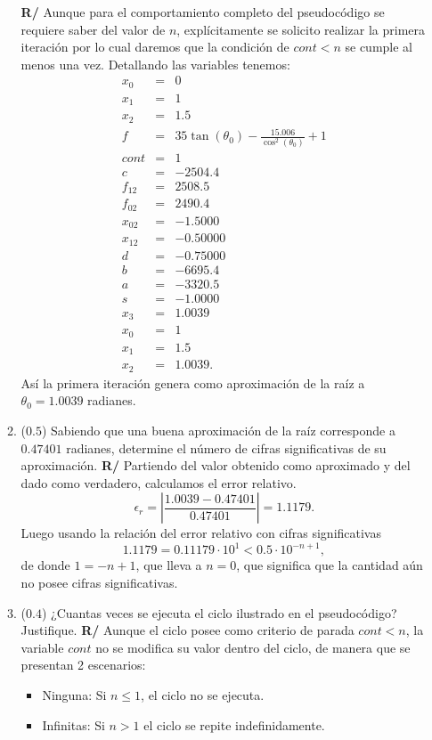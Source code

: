\documentclass[12pt]{article}
\begin{document}
\begin{enumerate}[leftmargin=*,widest=9]
\begin{enumerate}[label=\alph*]
\textbf{R/} Aunque para el comportamiento completo del pseudocódigo se requiere saber del valor de \(n\), explícitamente se solicito realizar la primera iteración por lo cual daremos que la condición de \(cont<n\) se cumple al menos una vez. Detallando las variables tenemos:
\begin{eqnarray*}
x_0 &=& 0\\
x_1 &=& 1\\
x_2 &=& 1.5\\
f &=& 35\tan(\theta_{0}) - \frac{15.006}{\cos^{2}(\theta_{0})} + 1\\
cont &=& 1\\
c &=& -2504.4\\
f_{12} &=& 2508.5\\
f_{02} &=& 2490.4\\
x_{02} &=& -1.5000\\
x_{12} &=& -0.50000\\
d &=& -0.75000\\
b &=& -6695.4\\
a &=& -3320.5\\
s &=& -1.0000\\
x_3 &=& 1.0039\\
x_0 &=& 1\\
x_1 &=& 1.5\\
x_2 &=& 1.0039.
\end{eqnarray*}
Así la primera iteración genera como aproximación de la raíz a \(\theta_0 = 1.0039\) radianes.
\item (\(0.5\)) Sabiendo que una buena aproximación de la raíz corresponde a \(0.47401\) radianes, determine el número de cifras significativas de su aproximación.
\textbf{R/} Partiendo del valor obtenido como aproximado y del dado como verdadero, calculamos el error relativo.
\[\epsilon_r = \left|\frac{1.0039-0.47401}{0.47401}\right| = 1.1179.\]
Luego usando la relación del error relativo con cifras significativas
\[ 1.1179 = 0.11179 \cdot 10^1 < 0.5 \cdot 10^{-n+1},\]
de donde \(1 = -n + 1\), que lleva a \(n=0\), que significa que la cantidad aún no posee cifras significativas.
\item (\(0.4\)) ¿Cuantas veces se ejecuta el ciclo ilustrado en el pseudocódigo? Justifique.
\textbf{R/} Aunque el ciclo posee como criterio de parada \(cont<n\), la variable \(cont\) no se modifica su valor dentro del ciclo, de manera que se presentan 2 escenarios:
\begin{itemize}
\item Ninguna: Si \(n \leq 1\), el ciclo no se ejecuta.
\item Infinitas: Si \(n > 1\) el ciclo se repite indefinidamente. 
\end{itemize}
\end{enumerate}
\end{enumerate}
\end{document}
